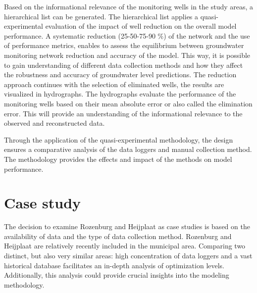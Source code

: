 Based on the informational relevance of the monitoring wells in the study areas, a hierarchical list can be generated. The hierarchical list applies a quasi-experimental evaluation of the impact of well reduction on the overall model performance. A systematic reduction (25-50-75-90 \%) of the network and the use of performance metrics, enables to assess the equilibrium between groundwater monitoring network reduction and accuracy of the model. This way, it is possible to gain understanding of different data collection methods and how they affect the robustness and accuracy of groundwater level predictions. The reduction approach continues with the selection of eliminated wells, the results are visualized in hydrographs. The hydrographs evaluate the performance of the monitoring wells based on their mean absolute error or also called the elimination error. This will provide an understanding of the informational relevance to the observed and reconstructed data. 

Through the application of the quasi-experimental methodology, the design ensures a comparative analysis of the data loggers and manual collection method. The methodology provides the effects and impact of the methods on model performance. 

\section{Case study}
The decision to examine Rozenburg and Heijplaat as case studies is based on the availability of data and the type of data collection method. Rozenburg and Heijplaat are relatively recently included in the municipal area. Comparing two distinct, but also very similar areas: high concentration of data loggers and a vast historical database facilitates an in-depth analysis of optimization levels. Additionally, this analysis could provide crucial insights into the modeling methodology.


